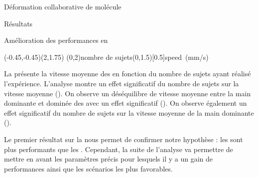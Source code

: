 \documentclass[myfrancais]{mythesis}
\begin{document}
\begin{mychapter}{Déformation collaborative de molécule}
\begin{mysection}{Résultats}
\begin{mysubsection}{Amélioration des performances en }
				\begin{myfigure}
					\begin{myps}(-0.45,-0.45)(2,1.75)
						\myaxes(0,2){nombre de sujets}(0,1.5)[0.5]{speed~(mm/s)}
					\end{myps}
				\end{myfigure}

				La  présente la vitesse moyenne  des  en fonction du nombre de sujets  ayant réalisé l'expérience.
				L'analyse montre un effet significatif du nombre de sujets  sur la vitesse moyenne  ().
				On observe un déséquilibre de vitesse moyenne entre la main dominante et dominée des  avec un effet significatif ().
				On observe également un effet significatif du nombre de sujets  sur la vitesse moyenne  de la main dominante ().

				Le premier résultat sur la  nous permet de confirmer notre hypothèse  : les  sont plus performants que les .
				Cependant, la suite de l'analyse va permettre de mettre en avant les paramètres précis pour lesquels il y a un gain de performances ainsi que les scénarios les plus favorables.


\end{mysubsection}
\end{mysection}
\end{mychapter}
\end{document}
